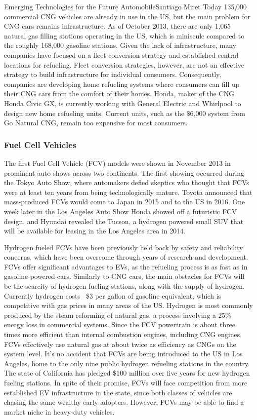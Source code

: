 \documentclass{papertex}
\begin{document}
\begin{news}{2}{Emerging Technologies for the Future Automobile}{Santiago Miret}{}{}
Today 135,000 commercial CNG vehicles are already in use in the US, but the main
problem for CNG cars remains infrastructure. As of October 2013, there are only
1,065 natural gas filling stations operating in the US, which is miniscule
compared to the roughly 168,000 gasoline stations. Given the lack of
infrastructure, many companies have focused on a fleet conversion strategy and
established central locations for refueling. Fleet conversion strategies,
however, are not an effective strategy to build infrastructure for individual
consumers. Consequently, companies are developing home refueling systems where
consumers can fill up their CNG cars from the comfort of their homes. Honda,
maker of the CNG Honda Civic GX, is currently working with General Electric and
Whirlpool to design new home refueling units. Current units, such as the \$6,000
system from Go Natural CNG, remain too expensive for most consumers.

\subsubsection*{Fuel Cell Vehicles}

The first Fuel Cell Vehicle (FCV) models were shown in November 2013 in
prominent auto shows across two continents. The first showing occurred during
the Tokyo Auto Show, where automakers defied skeptics who thought that FCVs were
at least ten years from being technologically mature. Toyota announced that
mass-produced FCVs would come to Japan in 2015 and to the US in 2016. One week
later in the Los Angeles Auto Show Honda showed off a futuristic FCV design, and
Hyundai revealed the Tucson, a hydrogen powered small SUV that will be available
for leasing in the Los Angeles area in 2014.

Hydrogen fueled FCVs have been previously held back by safety and reliability
concerns, which have been overcome through years of research and development.
FCVs offer significant advantages to EVs, as the refueling process is as fast as
in gasoline-powered cars. Similarly to CNG cars, the main obstacles for FCVs
will be the scarcity of hydrogen fueling stations, along with the supply of
hydrogen. Currently hydrogen costs ~\$3 per gallon of gasoline equivalent, which
is competitive with gas prices in many areas of the US. Hydrogen is most
commonly produced by the steam reforming of natural gas, a process involving a
25\% energy loss in commercial systems. Since the FCV powertrain is about three
times more efficient than internal combustion engines, including CNG engines,
FCVs effectively use natural gas at about twice as efficiency as CNGs on the
system level. It's no accident that FCVs are being introduced to the US in Los
Angeles, home to the only nine public hydrogen refueling stations in the
country. The state of California has pledged \$100 million over five years for
new hydrogen fueling stations. In spite of their promise, FCVs will face
competition from more established EV infrastructure in the state, since both
classes of vehicles are chasing the same wealthy early-adopters. However, FCVs
may be able to find a market niche in heavy-duty vehicles.


\end{news}
\end{document}
